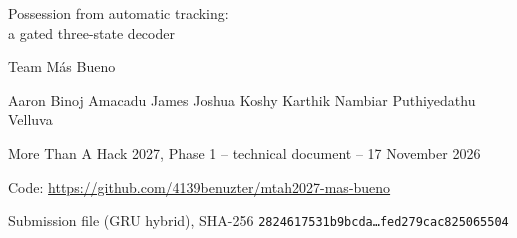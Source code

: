 \documentclass[11pt,a4paper]{article}
\newcommand{\code}[1]{\texttt{#1}}
\begin{document}
\begin{center}
{\LARGE Possession from automatic tracking:\\[0.25em] a gated three-state decoder\par}
\vspace{1.0em}
{\large Team Más Bueno\par}
\vspace{0.4em}
Aaron Binoj Amacadu \qquad James Joshua Koshy \qquad Karthik Nambiar Puthiyedathu Velluva\par
\vspace{0.6em}
{\small More Than A Hack 2027, Phase 1 -- technical document -- 17 November 2026\par
Code: \url{https://github.com/4139benuzter/mtah2027-mas-bueno} \par Submission file (GRU hybrid), SHA-256 \texttt{2824617531b9bcda\ldots{}fed279cac825065504}\par}
\end{center}
\vspace{0.5em}

\begin{abstract}
We label every frame as home (\code{H}), away (\code{A}) or dead ball
(\code{D}) with a three-state hidden Markov chain decoded by Viterbi. The challenge's own
definition of possession is written into the decoder: a change of side is cheap \emph{only} where
the gaining side starts a controlled contact or a completed pass; touches, deflections and duels
are neutral; the ball is dead when it is out, between going out and the restart kick, or when
nobody on the pitch is running. There is no machine-learning model trained on this match, no
label of this match was used, and the pipeline (numpy and pandas, about 15\,s on a laptop) contains
no language model. Every setting that is not a physical or football quantity was chosen on
\emph{other} labelled matches, by selection rules committed to the repository before their results
existed. The submitted file keeps this decoder's dead-ball decisions and, where the ball is
alive, takes the side from a bidirectional GRU network trained only on other matches (the GRU hybrid
of Section~3).

\end{abstract}
\end{document}
